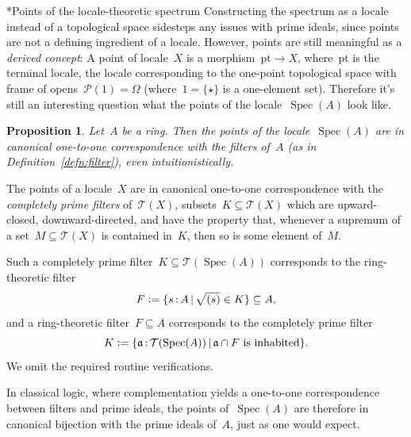 \documentclass[10pt,reqno,a4paper]{amsbook}
\makeatletter
\theoremstyle{definition}
\theoremstyle{plain}
\newtheorem{prop}[defn]{Proposition}
\theoremstyle{remark}
\renewcommand{\P}{\mathcal{P}}
\newcommand{\T}{\mathcal{T}}
\newcommand{\aaa}{\mathfrak{a}}
\newcommand{\pt}{\mathrm{pt}}
\DeclareMathOperator{\Spec}{Spec}
\newcommand{\Open}{\T}
\newcommand{\?}{\,{:}\,}
\renewcommand{\_}{\mathpunct{.}\,}
\newcommand{\defeq}{\vcentcolon=}
\newcommand{\nocontentsline}[3]{}
\newcommand{\tocless}[1]{\let\addcontentsline=\nocontentsline}
\renewenvironment{proof}[1][\proofname]{\par
  \pushQED{\qed}%
  \normalfont \topsep6\p@\@plus6\p@\relax
  \trivlist
  \item[\hskip\labelsep
        \itshape
    #1\@addpunct{.}]\ignorespaces
}{%
  \popQED\endtrivlist\@endpefalse
}
\def\subsection{\@startsection{subsection}{2}%
  {0pt}{.5\linespacing\@plus.7\linespacing}{-.5em}%
  {\normalfont\bfseries}}
\makeatother
\begin{document}
{\tocless

\subsection*{Points of the locale-theoretic spectrum}
Constructing the spectrum as a locale instead of a topological space
sidesteps any issues with prime ideals, since points are not a defining
ingredient of a locale. However, points are still meaningful as a \emph{derived
concept}: A point of locale~$X$ is a morphism~$\pt \to X$, where~$\pt$ is the
terminal locale, the locale corresponding to the one-point topological space
with frame of opens~$\P(1) = \Omega$ (where~$1 = \{ \star \}$ is a one-element set).
Therefore it's still an interesting question what the points of the
locale~$\Spec(A)$ look like.

\begin{prop}\label{prop:points-spectrum}
Let~$A$ be a ring. Then the points of the locale~$\Spec(A)$ are in
canonical one-to-one correspondence with the filters of~$A$
(as in Definition~\ref{defn:filter}), even intuitionistically.\end{prop}

\begin{proof}The points of a locale~$X$ are in canonical one-to-one
correspondence with the \emph{completely prime filters} of~$\Open(X)$,
subsets~$K \subseteq \Open(X)$ which are upward-closed, downward-directed, and
have the property that, whenever a supremum of a set~$M \subseteq \Open(X)$ is
contained in~$K$, then so is some element of~$M$.

Such a completely prime filter~$K \subseteq \Open(\Spec(A))$ corresponds to the
ring-theoretic filter
\[ F \defeq \{ s \? A \,|\, \sqrt{(s)} \in K \} \subseteq A, \]
and a ring-theoretic filter~$F \subseteq A$ corresponds to the completely prime
filter
\[ K \defeq \{ \aaa \? \Open(\Spec(A)) \,|\,
  \text{$\aaa \cap F$ is inhabited} \}. \]
We omit the required routine verifications.
\end{proof}

In classical logic, where complementation yields a one-to-one correspondence
between filters and prime ideals, the points of~$\Spec(A)$ are therefore in
canonical bijection with the prime ideals of~$A$, just as one would expect.

}
\end{document}
